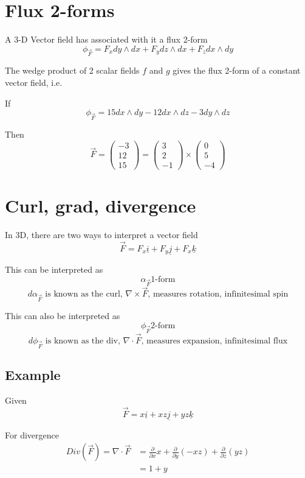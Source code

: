 \section{Flux 2-forms}

A 3-D Vector field has associated with it a flux 2-form
\[
   \phi_{\vec{F}} = F_x dy \wedge dx + F_y dz \wedge dx + F_z dx\wedge dy
\] 

The wedge product of 2 scalar fields $f$ and $g$ gives the flux 2-form of a constant vector field, i.e.

If
\[
   \phi_{\vec{F}} = 15 dx \wedge dy - 12 dx \wedge dz - 3 dy \wedge dz
\] 

Then
\[
  \vec{F} = \begin{pmatrix} -3 \\ 12 \\ 15 \end{pmatrix}  = \begin{pmatrix} 3 \\ 2 \\ -1 \end{pmatrix}  \times \begin{pmatrix} 0 \\ 5 \\ -4 \end{pmatrix} 
\] 

\section{Curl, grad, divergence}

In 3D, there are two ways to interpret a vector field
\[
  \vec{F} = F_x \underline{i} + F_y \underline{j} + F_x \underline{k}
\] 

This can be interpreted as 
\[
   \alpha_{\vec{F}} \text{1-form}
\] 
\[
   d \alpha_{\vec{F}} \text{ is known as the curl, } \nabla \times \vec{F}\text{, measures rotation, infinitesimal spin}
\] 

This can also be interpreted as 
\[
   \phi_{\vec{F}} \text{2-form}
\] 
\[
   d \phi_{\vec{F}} \text{ is known as the div, } \nabla \cdot \vec{F} \text{, measures expansion, infinitesimal flux}
\] 

\subsection{Example}

Given
\[
  \vec{F} = x \underline{i} + xz \underline{j} + yz \underline{k}
\] 

For divergence
\begin{align*}
   Div( \vec{F}) = \nabla \cdot \vec{F} &= \frac{\partial }{\partial x}x + \frac{\partial }{\partial y} \left( -xz \right)  + \frac{\partial }{\partial z} \left( yz \right)  \\
   &= 1 + y
\end{align*}

